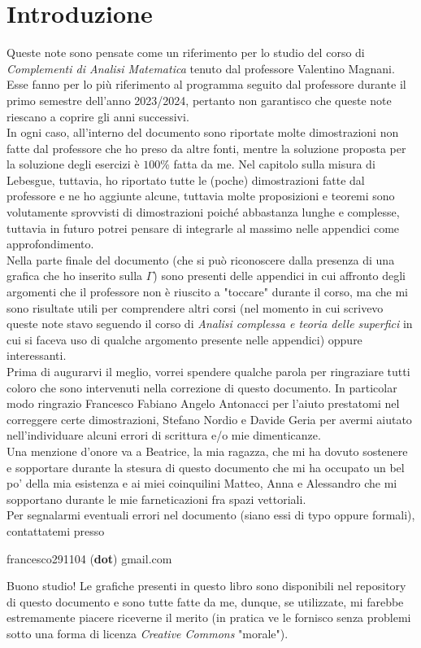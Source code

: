 \documentclass[12pt, twoside, italian, openany]{book}
\begin{document}
	\chapter*{Introduzione}
	Queste note sono pensate come un riferimento per lo studio del corso di \emph{Complementi di Analisi Matematica} tenuto dal professore
	Valentino Magnani. Esse fanno per lo più riferimento al programma seguito dal professore durante il primo semestre dell'anno 2023/2024,
	pertanto non garantisco che queste note riescano a coprire gli anni successivi. \\
	In ogni caso, all'interno del documento sono riportate molte dimostrazioni non fatte dal professore che ho preso da altre fonti, mentre
	la soluzione proposta per la soluzione degli esercizi è $100$\% fatta da me. Nel capitolo sulla misura di Lebesgue, tuttavia, ho riportato tutte le (poche) dimostrazioni fatte dal professore e ne ho aggiunte alcune, tuttavia molte 
	proposizioni e teoremi sono volutamente sprovvisti di dimostrazioni poiché abbastanza lunghe e complesse, tuttavia in futuro potrei pensare di integrarle al massimo nelle appendici come approfondimento. \\
	Nella parte finale del documento (che si può riconoscere dalla presenza di una grafica che ho inserito sulla $\Gamma$) sono presenti delle appendici in cui affronto degli argomenti che il professore non è riuscito a "toccare" durante il corso,
	ma che mi sono risultate utili per comprendere altri corsi (nel momento in cui scrivevo queste note stavo seguendo il corso di \emph{Analisi complessa e teoria delle superfici} in cui si faceva uso di qualche argomento presente nelle appendici) oppure interessanti. \\
	Prima di augurarvi il meglio, vorrei spendere qualche parola per ringraziare tutti coloro che sono intervenuti nella correzione di questo documento. In particolar modo ringrazio Francesco Fabiano Angelo Antonacci per l'aiuto prestatomi nel correggere certe dimostrazioni, Stefano Nordio e Davide Geria per avermi aiutato nell'individuare alcuni errori di scrittura e/o mie dimenticanze. \\
	Una menzione d'onore va a Beatrice, la mia ragazza, che mi ha dovuto sostenere e sopportare durante la stesura di questo documento che mi ha occupato un bel po' della mia esistenza e ai miei coinquilini Matteo, Anna e Alessandro che mi sopportano durante le mie farneticazioni fra spazi vettoriali. \\
	Per segnalarmi eventuali errori nel documento (siano essi di typo oppure formali), contattatemi presso
	\begin{center}
		francesco291104 (\textbf{dot}) gmail.com
	\end{center}
	Buono studio!
	\vfill
	Le grafiche presenti in questo libro sono disponibili nel repository di questo documento e sono tutte fatte da me, dunque, se utilizzate, mi farebbe estremamente piacere riceverne il merito (in pratica ve le fornisco senza problemi sotto una forma di licenza \emph{Creative Commons} "morale").
\end{document}
